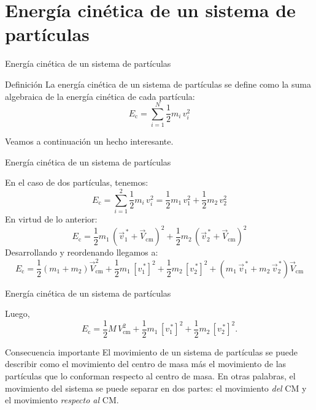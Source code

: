 \documentclass[11pt,handout,aspectratio=1610]{beamer}
\begin{document}
\section{Energía cinética de un sistema de partículas}

\begin{frame}{Energía cinética de un sistema de partículas}

    \begin{block}{Definición}
        La energía cinética de un sistema de partículas se define como la suma algebraica de la energía cinética de cada partícula: $$E_\text{c} = \sum_{i=1}^N \frac{1}{2} m_i \, v_i^2$$
    \end{block} \pause

    Veamos a continuación un hecho interesante.
    
\end{frame}

\begin{frame}{Energía cinética de un sistema de partículas}

    En el caso de dos partículas, tenemos:
    $$E_\text{c} = \sum_{i=1}^2 \frac{1}{2} m_i \, v_i^2 = \frac{1}{2} m_1 \, v_1^2 + \frac{1}{2} m_2 \, v_2^2$$ \pause En virtud de lo anterior:
    $$E_\text{c} = \frac{1}{2} m_1 \, \left(\vec{v}_1^{\,\ast} + \vec{V}_\text{cm}\right)^2 + \frac{1}{2} m_2 \, \left(\vec{v}_2^{\,\ast} + \vec{V}_\text{cm}\right)^2$$ \pause Desarrollando y reordenando llegamos a:
    $$
        E_\text{c} = \frac{1}{2} \left(m_1 + m_2\right) \vec{V}_\text{cm}^2 + \frac{1}{2} m_1 \, \left[v_1^{\,\ast}\right]^2 + \frac{1}{2} m_2 \, \left[v_2^{\,\ast}\right]^2 + \left(m_1 \, \vec{v}_1^{\,\ast} + m_2 \, \vec{v}^{\,\ast}_2\right) \vec{V}_\text{cm}
    $$

    
\end{frame}

\begin{frame}{Energía cinética de un sistema de partículas}

    Luego, $$E_\text{c} = \frac{1}{2} M \, V_\text{cm}^2 + \frac{1}{2} m_1 \, \left[v_1^{\,\ast}\right]^2 + \frac{1}{2} m_2 \, \left[v_2^{\,\ast}\right]^2.$$ \pause

    \begin{block}{Consecuencia importante}
        El movimiento de un sistema de partículas se puede describir como el movimiento del centro de masa más el movimiento de las partículas que lo conforman respecto al centro de masa. En otras palabras, el movimiento del sistema se puede separar en dos partes: el movimiento \emph{del} CM y el movimiento \emph{respecto al} CM.
    \end{block}

\end{frame}
\end{document}
